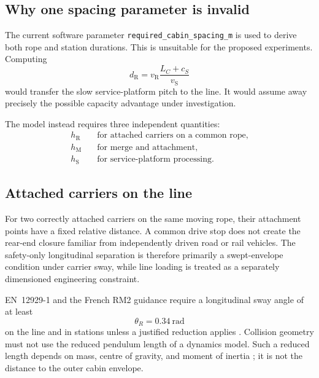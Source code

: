 \documentclass[11pt,a4paper]{scrartcl}
\newcommand{\vlinehaul}{v_{\mathrm R}}
\newcommand{\vstation}{v_{\mathrm S}}
\newcommand{\hlinehaul}{h_{\mathrm R}}
\newcommand{\hmerge}{h_{\mathrm M}}
\newcommand{\hservice}{h_{\mathrm S}}
\begin{document}
\subsection{Why one spacing parameter is invalid}

The current software parameter \texttt{required\_cabin\_spacing\_m} is used to
derive both rope and station durations.  This is unsuitable for the proposed
experiments.  Computing
\[
d_{\mathrm R}=\vlinehaul\frac{L_C+c_S}{\vstation}
\]
would transfer the slow service-platform pitch to the line.  It would assume
away precisely the possible capacity advantage under investigation.

The model instead requires three independent quantities:
\begin{align*}
\hlinehaul &\quad\text{for attached carriers on a common rope},\\
\hmerge    &\quad\text{for merge and attachment},\\
\hservice  &\quad\text{for service-platform processing}.
\end{align*}

\subsection{Attached carriers on the line}

For two correctly attached carriers on the same moving rope, their attachment
points have a fixed relative distance.  A common drive stop does not create the
rear-end closure familiar from independently driven road or rail vehicles.
The safety-only longitudinal separation is therefore primarily a swept-envelope
condition under carrier sway, while line loading is treated as a separately
dimensioned engineering constraint.

EN~12929-1 and the French RM2 guidance require a longitudinal sway angle of at
least
\[
\theta_R=0.34\ \mathrm{rad}
\]
on the line and in stations unless a justified reduction applies
\cite[Sec.~6.3.5]{en12929,strmtgRM2}.  Collision geometry must not use the
reduced pendulum length of a dynamics model.  Such a reduced length depends on
mass, centre of gravity, and moment of inertia \cite{wenin2019}; it is not the
distance to the outer cabin envelope.
\end{document}
